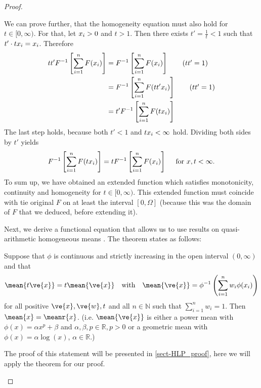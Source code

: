 \begin{proof}
\begin{proofpart}
		We can prove further, that the homogeneity equation must also hold for $t \in [0, \infty)$.	For that, let $x_i > 0$ and $t > 1$. Then there exists $t' = \frac{1}{t} < 1$ such that $t' \cdot t x_i = x_i$. Therefore
		\begin{align*}
			t t' F^{-1} \left[ \sum_{i=1}^{n} F(x_i) \right] & = F^{-1} \left[ \sum_{i=1}^{n} F(x_i) \right] \tag{$t t' = 1$}     \\
			                                                   & = F^{-1} \left[ \sum_{i=1}^{n} F(t t'x_i) \right] \tag{$t t' = 1$} \\
			                                                   & = t' F^{-1} \left[ \sum_{i=1}^{n} F(t x_i) \right]
		\end{align*}
		The last step holds, because both $t'<1$ and $t x_i < \infty$ hold.
		Dividing both sides by $t'$ yields
		\begin{equation*}
			F^{-1} \left[ \sum_{i=1}^{n} F(t x_i) \right] = t F^{-1} \left[ \sum_{i=1}^{n} F(x_i) \right] \quad \text{ for } x, t < \infty .
		\end{equation*}
		To sum up, we have obtained an extended function which satisfies monotonicity, continuity and homogeneity for $t \in [0, \infty)$. This extended function must coincide with tie original $F$ on at least the interval $[0, \Omega]$ (because this was the domain of $F$ that we deduced, before extending it).
	\end{proofpart}


	\begin{proofpart}
		Next, we derive a functional equation that allows us to use results on quasi-arithmetic homogeneous means \parencite[p. 68]{hardy1952inequalities}. The theorem states as follows:
		\begin{thm}
			Suppose that $\phi$ is continuous and strictly increasing in the open interval $(0,\infty)$ and that
			\begin{equation*}
				\mean{t \ve{x}} = t \mean{ \ve{x}} \quad  \text{with} \quad \mean{\ve{x} } = \phi^{-1} \left ( \sum_{i=1}^{n} w_i \phi(x_i) \right)
			\end{equation*}
			for all positive $\ve{x}, \ve{w}, t$ and all $n \in \mathbb{N}$ such that $\sum_{i=1}^{n} w_i = 1$. Then $\mean{x} = \meanr{x}$. (i.e. $\mean{\ve{x}}$ is either a power mean with $\phi(x) = \alpha x^p + \beta$ and $\alpha, \beta, p \in \mathbb{R}, p > 0$ or a geometric mean with $\phi(x) = \alpha \log (x)$, $\alpha \in \mathbb{R}$.)
		\end{thm}
		The proof of this statement will be presented in \cref{sect-HLP_proof}, here we will apply the theorem for our proof.


\end{proofpart}
\end{proof}
